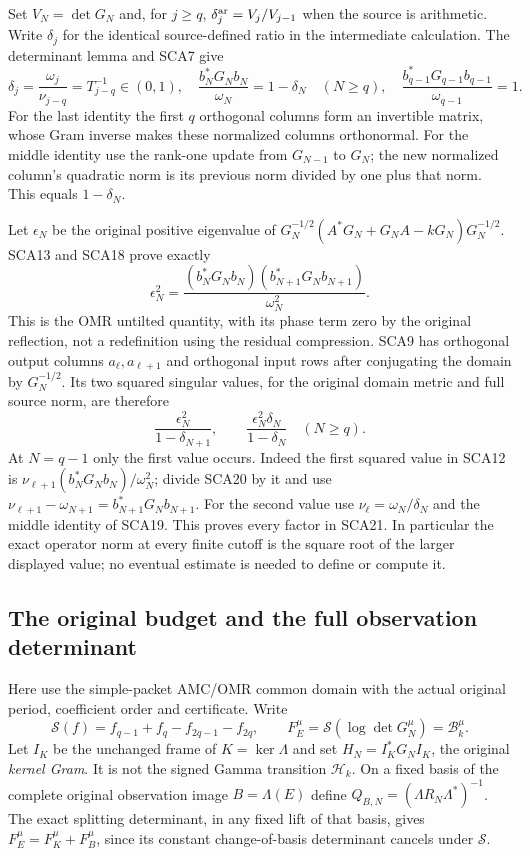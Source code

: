 Set $V_N=\det G_N$ and, for $j\ge q$,
$\delta_j^{\rm ar}=V_j/V_{j-1}$ when the source is arithmetic. Write
$\delta_j$ for the identical source-defined ratio in the intermediate
calculation. The determinant lemma and SCA7 give
\[
 \delta_j=\frac{\omega_j}{\nu_{j-q}}=T_{j-q}^{-1}\in(0,1),\quad
 \frac{b_N^*G_Nb_N}{\omega_N}=1-\delta_N\quad(N\ge q),\quad
 \frac{b_{q-1}^*G_{q-1}b_{q-1}}{\omega_{q-1}}=1.
 \tag{SCA19}
\]
For the last identity the first $q$ orthogonal columns form an invertible
matrix, whose Gram inverse makes these normalized columns orthonormal.
For the middle identity use the rank-one update from $G_{N-1}$ to $G_N$;
the new normalized column's quadratic norm is its previous norm divided
by one plus that norm. This equals $1-\delta_N$.

Let $\epsilon_N$ be the original positive eigenvalue of
$G_N^{-1/2}(A^*G_N+G_NA-kG_N)G_N^{-1/2}$.
SCA13 and SCA18 prove exactly
\[
 \epsilon_N^2
   =\frac{(b_N^*G_Nb_N)(b_{N+1}^*G_Nb_{N+1})}{\omega_N^2}.
 \tag{SCA20}
\]
This is the OMR untilted quantity, with its phase term zero by the original
reflection, not a redefinition using the residual compression.
SCA9 has orthogonal output columns $a_\ell,a_{\ell+1}$ and orthogonal
input rows after conjugating the domain by $G_N^{-1/2}$. Its two squared
singular values, for the original domain metric and full source norm, are
therefore
\[
 \boxed{\frac{\epsilon_N^2}{1-\delta_{N+1}},\qquad
        \frac{\epsilon_N^2\delta_N}{1-\delta_N}}
 \quad(N\ge q).
 \tag{SCA21}
\]
At $N=q-1$ only the first value occurs. Indeed the first squared value in
SCA12 is $\nu_{\ell+1}(b_N^*G_Nb_N)/\omega_N^2$; divide SCA20 by it
and use $\nu_{\ell+1}-\omega_{N+1}=b_{N+1}^*G_Nb_{N+1}$.
For the second value use
$\nu_\ell=\omega_N/\delta_N$ and the middle identity of SCA19.
This proves every factor in SCA21. In particular the exact operator norm
at every finite cutoff is the square root of the larger displayed value;
no eventual estimate is needed to define or compute it.

\subsection{The original budget and the full observation determinant}

Here use the simple-packet AMC/OMR common domain with the actual original
period, coefficient order and certificate. Write
\[
 \mathscr S(f)=f_{q-1}+f_q-f_{2q-1}-f_{2q},\qquad
 F_E^{\mu}=\mathscr S(\log\det G_N^{\mu})=\mathcal B_k^{\mu}.
 \tag{SCA22}
\]
Let $I_K$ be the unchanged frame of $K=\ker\Lambda$ and set
$H_N=I_K^*G_NI_K$, the original \emph{kernel Gram}. It is not the signed
Gamma transition $\mathcal H_k$. On a fixed basis of the complete original
observation image $B=\Lambda(E)$ define
$Q_{B,N}=(\Lambda R_N\Lambda^*)^{-1}$.
The exact splitting determinant, in any fixed lift of that basis, gives
$F_E^{\mu}=F_K^{\mu}+F_B^{\mu}$, since its constant change-of-basis
determinant cancels under $\mathscr S$.

